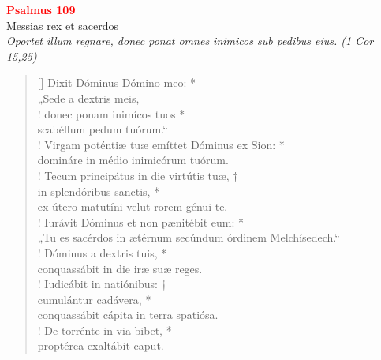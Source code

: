 
\def\greinitialformat#1{%
{\fontsize{39}{39}\selectfont #1}%
}




\begin{center}
 \textcolor{red}{\large \bf Psalmus 109}\\
Messias rex et sacerdos\\
\textit{\small Oportet illum regnare, donec ponat omnes inimicos sub pedibus eius. (1 Cor 15,25)}
\end{center}
\begin{verse}[\versewidth]
 Dixit Dóminus Dómino meo: *\\
„Sede a dextris meis,\\!
\vin  donec ponam inimícos tuos *\\
\vin  scabéllum pedum tuórum.“\\!
Virgam poténtiæ tuæ emíttet Dóminus ex Sion: *\\
domináre in médio inimicórum tuórum.\\!
\vin  Tecum principátus in die virtútis tuæ, †\\
\vin  in splendóribus sanctis, *\\
\vin  ex útero matutíni velut rorem génui te.\\!
Iurávit Dóminus et non pænitébit eum: *\\
„Tu es sacérdos in ætérnum secúndum órdinem Melchísedech.“\\!
\vin  Dóminus a dextris tuis, *\\
\vin  conquassábit in die iræ suæ reges.\\!
Iudicábit in natiónibus: †\\
cumulántur cadávera, *\\
conquassábit cápita in terra spatiósa.\\! %
\vin  De torrénte in via bibet, *\\
\vin  proptérea exaltábit caput.\\ 

\end{verse}
\vspace{1cm}

